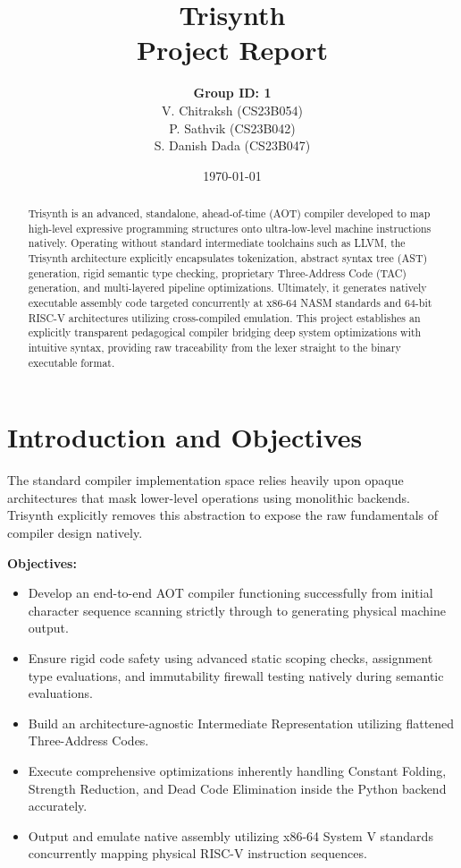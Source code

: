 \documentclass[12pt,a4paper]{article}
\title{\Huge \textbf{Trisynth}\\
\vspace{0.5cm}
\Large Project Report}
\author{
\textbf{Group ID: 1}\\
V. Chitraksh (CS23B054)\\
P. Sathvik (CS23B042)\\
S. Danish Dada (CS23B047)
}
\date{\today}
\begin{document}
\maketitle
\newpage

\begin{abstract}
Trisynth is an advanced, standalone, ahead-of-time (AOT) compiler developed to map high-level expressive programming structures onto ultra-low-level machine instructions natively. Operating without standard intermediate toolchains such as LLVM, the Trisynth architecture explicitly encapsulates tokenization, abstract syntax tree (AST) generation, rigid semantic type checking, proprietary Three-Address Code (TAC) generation, and multi-layered pipeline optimizations. Ultimately, it generates natively executable assembly code targeted concurrently at x86-64 NASM standards and 64-bit RISC-V architectures utilizing cross-compiled emulation. This project establishes an explicitly transparent pedagogical compiler bridging deep system optimizations with intuitive syntax, providing raw traceability from the lexer straight to the binary executable format.
\end{abstract}

\newpage
\tableofcontents
\newpage

\section{Introduction and Objectives}
The standard compiler implementation space relies heavily upon opaque architectures that mask lower-level operations using monolithic backends. Trisynth explicitly removes this abstraction to expose the raw fundamentals of compiler design natively.

\textbf{Objectives:}
\begin{itemize}
    \item Develop an end-to-end AOT compiler functioning successfully from initial character sequence scanning strictly through to generating physical machine output.
    \item Ensure rigid code safety using advanced static scoping checks, assignment type evaluations, and immutability firewall testing natively during semantic evaluations.
    \item Build an architecture-agnostic Intermediate Representation utilizing flattened Three-Address Codes.
    \item Execute comprehensive optimizations inherently handling Constant Folding, Strength Reduction, and Dead Code Elimination inside the Python backend accurately.
    \item Output and emulate native assembly utilizing x86-64 System V standards concurrently mapping physical RISC-V instruction sequences.
\end{itemize}
\end{document}
